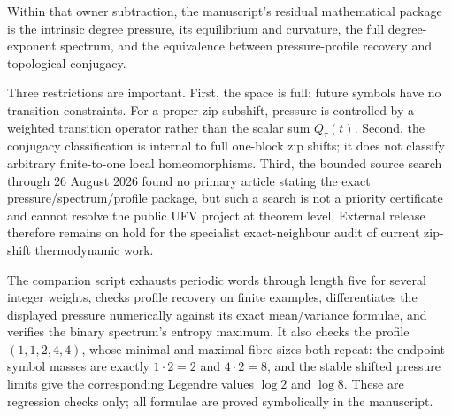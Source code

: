 Within that owner subtraction, the manuscript's residual mathematical package
is the intrinsic degree pressure, its equilibrium and curvature, the full
degree-exponent spectrum, and the equivalence between pressure-profile
recovery and topological conjugacy.

Three restrictions are important.  First, the space is full: future symbols
have no transition constraints.  For a proper zip subshift, pressure is
controlled by a weighted transition operator rather than the scalar sum
$Q_\tau(t)$.  Second, the conjugacy classification is internal to full
one-block zip shifts; it does not classify arbitrary finite-to-one local
homeomorphisms.  Third, the bounded source search through 26 August 2026 found
no primary article stating the exact pressure/spectrum/profile package, but
such a search is not a priority certificate and cannot resolve the public UFV
project at theorem level.  External release therefore remains on hold for the
specialist exact-neighbour audit of current zip-shift thermodynamic work.

The companion script exhausts periodic words through length five for several
integer weights, checks profile recovery on finite examples, differentiates
the displayed pressure numerically against its exact mean/variance formulae,
and verifies the binary spectrum's entropy maximum.  It also checks the
profile $(1,1,2,4,4)$, whose minimal and maximal fibre sizes both repeat: the
endpoint symbol masses are exactly $1\cdot2=2$ and $4\cdot2=8$, and the stable
shifted pressure limits give the corresponding Legendre values $\log2$ and
$\log8$.  These are regression checks only; all formulae are proved
symbolically in the manuscript.
